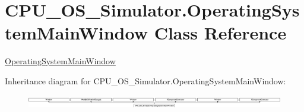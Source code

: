 \hypertarget{class_c_p_u___o_s___simulator_1_1_operating_system_main_window}{}\section{C\+P\+U\+\_\+\+O\+S\+\_\+\+Simulator.\+Operating\+System\+Main\+Window Class Reference}
\label{class_c_p_u___o_s___simulator_1_1_operating_system_main_window}


\hyperlink{class_c_p_u___o_s___simulator_1_1_operating_system_main_window}{Operating\+System\+Main\+Window}  


Inheritance diagram for C\+P\+U\+\_\+\+O\+S\+\_\+\+Simulator.\+Operating\+System\+Main\+Window\+:\begin{figure}[H]
\begin{center}
\leavevmode
\includegraphics[height=0.620155cm]{class_c_p_u___o_s___simulator_1_1_operating_system_main_window}
\end{center}
\end{figure}
